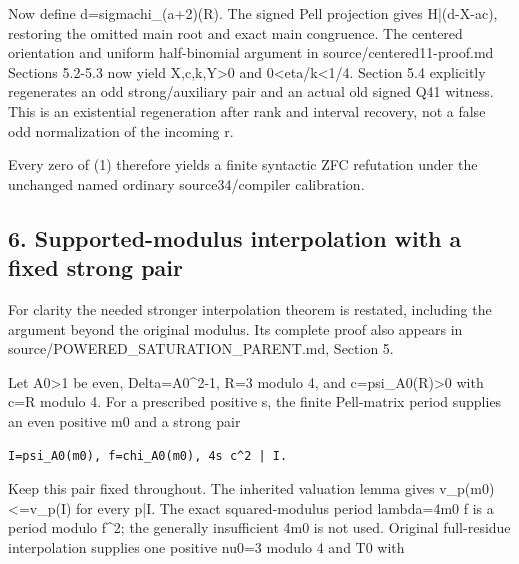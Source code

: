 Now define d=\allowbreak{}sigma\textasteriskcentered{}\allowbreak{}chi\_\allowbreak{}(a+\allowbreak{}2)(R). The signed Pell projection gives H|(d-X-ac), restoring the omitted main root and exact main congruence. The centered orientation and uniform half-binomial argument in source/\allowbreak{}centered11-proof.md Sections 5.2-5.3 now yield X,c,k,Y\textgreater{}\allowbreak{}0 and 0\textless{}\allowbreak{}eta/\allowbreak{}k\textless{}\allowbreak{}1/\allowbreak{}4. Section 5.4 explicitly regenerates an odd strong/\allowbreak{}auxiliary pair and an actual old signed Q41 witness. This is an existential regeneration after rank and interval recovery, not a false odd normalization of the incoming r.



Every zero of (1) therefore yields a finite syntactic ZFC refutation under the unchanged named ordinary source34/\allowbreak{}compiler calibration.



\subsection*{6. Supported-modulus interpolation with a fixed strong pair}



For clarity the needed stronger interpolation theorem is restated, including the argument beyond the original modulus. Its complete proof also appears in source/\allowbreak{}POWERED\_\allowbreak{}SATURATION\_\allowbreak{}PARENT.md, Section 5.



Let A0\textgreater{}\allowbreak{}1 be even, Delta=\allowbreak{}A0\textasciicircum{}\allowbreak{}2-1, R=\allowbreak{}3 modulo 4, and c=\allowbreak{}psi\_\allowbreak{}A0(R)\textgreater{}\allowbreak{}0 with c=\allowbreak{}R modulo 4. For a prescribed positive s, the finite Pell-matrix period supplies an even positive m0 and a strong pair



\begin{verbatim}
I=psi_A0(m0), f=chi_A0(m0), 4s c^2 | I.
\end{verbatim}

Keep this pair fixed throughout. The inherited valuation lemma gives v\_\allowbreak{}p(m0)\textless{}\allowbreak{}=\allowbreak{}v\_\allowbreak{}p(I) for every p|I. The exact squared-modulus period lambda=\allowbreak{}4m0 f is a period modulo f\textasciicircum{}\allowbreak{}2; the generally insufficient 4m0 is not used. Original full-residue interpolation supplies one positive nu0=\allowbreak{}3 modulo 4 and T0 with



